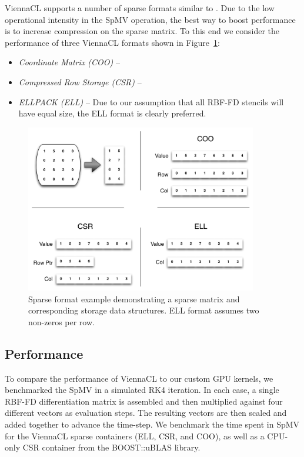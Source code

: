 \documentclass{report}
\begin{document}
ViennaCL supports a number of sparse formats similar to \cite{Bell2009,Cusp2012}. Due to the low operational intensity in the SpMV operation, the best way to boost performance is to increase compression on the sparse matrix. To this end we consider the performance of three ViennaCL formats shown in Figure~\ref{fig:sparse_format}: 
\begin{itemize} 
\item \emph{Coordinate Matrix (COO)} -- 
\item \emph{Compressed Row Storage (CSR)} -- 
\item \emph{ELLPACK (ELL)} -- 
Due to our assumption that all RBF-FD stencils will have equal size, the ELL format is clearly preferred. 
\end{itemize}


\begin{figure}
\centering
\includegraphics[width=0.9\textwidth]{gpu_content/omnigraffle/SparseStorage.pdf}
\caption{Sparse format example demonstrating a sparse matrix and corresponding storage data structures. ELL format assumes two non-zeros per row. }
\label{fig:sparse_format}
\end{figure}


\subsection{Performance}
To compare the performance of ViennaCL to our custom GPU kernels, we benchmarked the SpMV in a simulated RK4 iteration. In each case, a single RBF-FD differentiation matrix is assembled and then multiplied against four different vectors as evaluation steps. The resulting vectors are then scaled and added together to advance the time-step. We benchmark the time spent in SpMV for the ViennaCL sparse containers (ELL, CSR, and COO), as well as a CPU-only CSR container from the BOOST::uBLAS library. 
\end{document}
